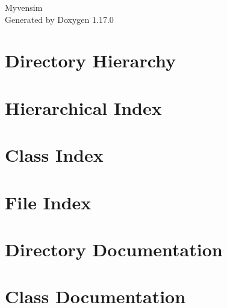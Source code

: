 \documentclass[twoside]{book}
\newcommand{\+}{\discretionary{\mbox{\scriptsize$\hookleftarrow$}}{}{}}
\newcommand{\clearemptydoublepage}{%
    \newpage{\pagestyle{empty}\cleardoublepage}%
  }
\begin{document}
  \raggedbottom
    \hypersetup{pageanchor=false,
                bookmarksnumbered=true,
                pdfencoding=unicode
               }
  \begin{titlepage}
  \vspace*{7cm}
  \begin{center}%
  {\Large Myvensim}\\
  \vspace*{1cm}
  {\large Generated by Doxygen 1.17.0}\\
  \end{center}
  \end{titlepage}
  \clearemptydoublepage
  \tableofcontents
  \clearemptydoublepage
  \hypersetup{pageanchor=true}
\chapter{Directory Hierarchy}

\chapter{Hierarchical Index}

\chapter{Class Index}

\chapter{File Index}

\chapter{Directory Documentation}




\chapter{Class Documentation}














\end{document}
